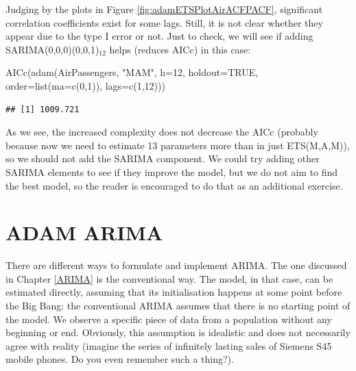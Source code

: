 \documentclass[
]{book}
\newenvironment{Shaded}{\begin{snugshade}}{\end{snugshade}}
\newcommand{\AttributeTok}[1]{\textcolor[rgb]{0.77,0.63,0.00}{#1}}
\newcommand{\ConstantTok}[1]{\textcolor[rgb]{0.00,0.00,0.00}{#1}}
\newcommand{\DecValTok}[1]{\textcolor[rgb]{0.00,0.00,0.81}{#1}}
\newcommand{\FunctionTok}[1]{\textcolor[rgb]{0.00,0.00,0.00}{#1}}
\newcommand{\NormalTok}[1]{#1}
\newcommand{\StringTok}[1]{\textcolor[rgb]{0.31,0.60,0.02}{#1}}
\theoremstyle{definition}
\theoremstyle{definition}
\theoremstyle{definition}
\theoremstyle{definition}
\theoremstyle{remark}
\begin{document}
Judging by the plots in Figure \ref{fig:adamETSPlotAirACFPACF}, significant correlation coefficients exist for some lags. Still, it is not clear whether they appear due to the type I error or not. Just to check, we will see if adding SARIMA(0,0,0)(0,0,1)\(_{12}\) helps (reduces AICc) in this case:

\begin{Shaded}
\begin{Highlighting}[]
\FunctionTok{AICc}\NormalTok{(}\FunctionTok{adam}\NormalTok{(AirPassengers, }\StringTok{"MAM"}\NormalTok{, }\AttributeTok{h=}\DecValTok{12}\NormalTok{, }\AttributeTok{holdout=}\ConstantTok{TRUE}\NormalTok{,}
          \AttributeTok{order=}\FunctionTok{list}\NormalTok{(}\AttributeTok{ma=}\FunctionTok{c}\NormalTok{(}\DecValTok{0}\NormalTok{,}\DecValTok{1}\NormalTok{)), }\AttributeTok{lags=}\FunctionTok{c}\NormalTok{(}\DecValTok{1}\NormalTok{,}\DecValTok{12}\NormalTok{)))}
\end{Highlighting}
\end{Shaded}

\begin{verbatim}
## [1] 1009.721
\end{verbatim}

As we see, the increased complexity does not decrease the AICc (probably because now we need to estimate 13 parameters more than in just ETS(M,A,M)), so we should not add the SARIMA component. We could try adding other SARIMA elements to see if they improve the model, but we do not aim to find the best model, so the reader is encouraged to do that as an additional exercise.

\hypertarget{ADAMARIMA}{%
\chapter{ADAM ARIMA}\label{ADAMARIMA}}

There are different ways to formulate and implement ARIMA. The one discussed in Chapter \ref{ARIMA} is the conventional way. The model, in that case, can be estimated directly, assuming that its initialisation happens at some point before the Big Bang: the conventional ARIMA assumes that there is no starting point of the model. We observe a specific piece of data from a population without any beginning or end. Obviously, this assumption is idealistic and does not necessarily agree with reality (imagine the series of infinitely lasting sales of Siemens S45 mobile phones. Do you even remember such a thing?).
\end{document}
